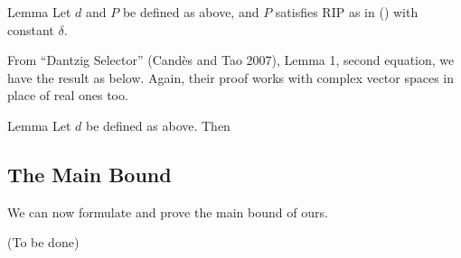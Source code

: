 \Result
{Lemma}
{
Let \(d\) and \(P\) be defined as above, and \(P\) satisfies RIP as in () with constant \(\delta\).
%
%
}

From ``Dantzig Selector'' (Cand\`es and Tao 2007), Lemma 1, second equation, we have the result as below.
Again, their proof works with complex vector spaces in place of real ones too.

\Result
{Lemma}
{
Let \(d\) be defined as above.
Then
%
%
}

\subsection{The Main Bound}

We can now formulate and prove the main bound of ours.

{ \color{red} (To be done) }

